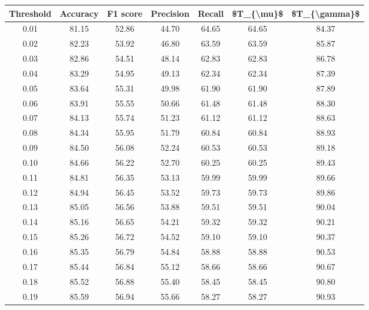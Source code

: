 \begin{tabular}{|c|c|c|c|c|c|c|}
\hline
 Threshold &  Accuracy &  F1 score &  Precision &  Recall &  \$T\_\{\textbackslash mu\}\$ &  \$T\_\{\textbackslash gamma\}\$ \\
\hline
      0.01 &     81.15 &     52.86 &      44.70 &   64.65 &      64.65 &         84.37 \\
      0.02 &     82.23 &     53.92 &      46.80 &   63.59 &      63.59 &         85.87 \\
      0.03 &     82.86 &     54.51 &      48.14 &   62.83 &      62.83 &         86.78 \\
      0.04 &     83.29 &     54.95 &      49.13 &   62.34 &      62.34 &         87.39 \\
      0.05 &     83.64 &     55.31 &      49.98 &   61.90 &      61.90 &         87.89 \\
      0.06 &     83.91 &     55.55 &      50.66 &   61.48 &      61.48 &         88.30 \\
      0.07 &     84.13 &     55.74 &      51.23 &   61.12 &      61.12 &         88.63 \\
      0.08 &     84.34 &     55.95 &      51.79 &   60.84 &      60.84 &         88.93 \\
      0.09 &     84.50 &     56.08 &      52.24 &   60.53 &      60.53 &         89.18 \\
      0.10 &     84.66 &     56.22 &      52.70 &   60.25 &      60.25 &         89.43 \\
      0.11 &     84.81 &     56.35 &      53.13 &   59.99 &      59.99 &         89.66 \\
      0.12 &     84.94 &     56.45 &      53.52 &   59.73 &      59.73 &         89.86 \\
      0.13 &     85.05 &     56.56 &      53.88 &   59.51 &      59.51 &         90.04 \\
      0.14 &     85.16 &     56.65 &      54.21 &   59.32 &      59.32 &         90.21 \\
      0.15 &     85.26 &     56.72 &      54.52 &   59.10 &      59.10 &         90.37 \\
      0.16 &     85.35 &     56.79 &      54.84 &   58.88 &      58.88 &         90.53 \\
      0.17 &     85.44 &     56.84 &      55.12 &   58.66 &      58.66 &         90.67 \\
      0.18 &     85.52 &     56.88 &      55.40 &   58.45 &      58.45 &         90.80 \\
      0.19 &     85.59 &     56.94 &      55.66 &   58.27 &      58.27 &         90.93 \\

\end{tabular}
